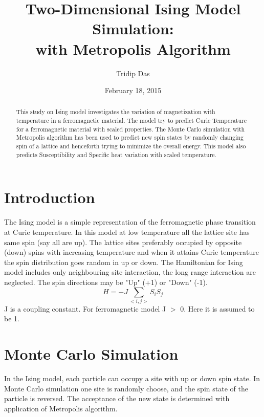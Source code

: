 \documentclass[]{article}
\begin{document}
\title{Two-Dimensional Ising Model Simulation:\\with Metropolis Algorithm}%
\author{Tridip Das}
\date{February 18, 2015}%
\maketitle

\begin{abstract}
This study on Ising model investigates the variation of magnetization with temperature in a ferromagnetic material.
The model try to predict Curie Temperature for a ferromagnetic material with scaled properties. The Monte Carlo simulation with Metropolis algorithm has been
used to predict new spin states by randomly changing spin of a lattice and henceforth trying to minimize the overall energy.
This model also predicts Susceptibility and Specific heat variation with scaled temperature.
\end{abstract}


\section{Introduction} %
\label{sec:level1} %

The Ising model is a simple representation of the ferromagnetic phase transition at Curie temperature. In this model at low temperature all the lattice site has same spin (say all are up).
The lattice sites preferably occupied by opposite (down) spins with increasing temperature and when it attains Curie temperature the spin distribution goes random in up or down.
The Hamiltonian for Ising model includes only neighbouring site interaction, the long range interaction are neglected. The spin directions may be "Up" (+1) or "Down" (-1).
\begin{equation}
\label{eq:one} %
  H = - J \sum_{<i,j>} S_i S_j
\end{equation}
J is a coupling constant. For ferromagnetic model J $>$ 0. Here it is assumed to be 1.

\section{Monte Carlo Simulation}
In the Ising model, each particle can occupy a site with up or down spin state. In Monte Carlo simulation one site is randomly choose, and the spin state of the particle is reversed.
The acceptance of the new state is determined with application of Metropolis algorithm.
\end{document}
